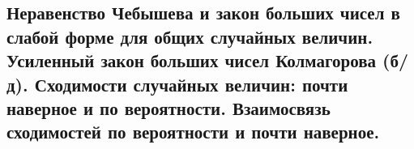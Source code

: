 \subsection{Неравенство Чебышева и закон больших чисел в слабой форме для общих случайных величин. Усиленный закон больших чисел Колмагорова (б/д). Сходимости случайных величин: почти наверное и по вероятности. Взаимосвязь сходимостей по вероятности и почти наверное.}